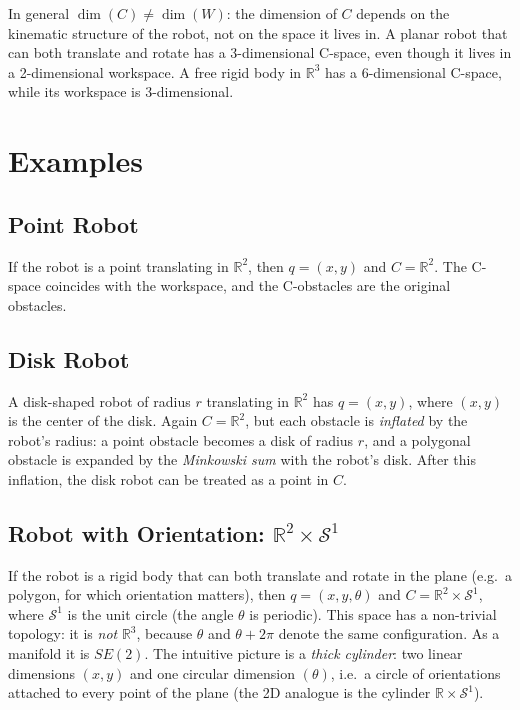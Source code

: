 In general \( \dim(C) \neq \dim(W) \): the dimension of \( C \) depends
on the kinematic structure of the robot, not on the space it lives in.
A planar robot that can both translate and rotate has a 3-dimensional
C-space, even though it lives in a 2-dimensional workspace. A free
rigid body in \( \mathbb{R}^3 \) has a 6-dimensional C-space, while
its workspace is 3-dimensional.

\section{Examples}
\label{sec:cspace-examples}

\subsection{Point Robot}
\label{subsec:point-robot}

If the robot is a point translating in \( \mathbb{R}^2 \), then
\( q = (x, y) \) and \( C = \mathbb{R}^2 \). The C-space coincides
with the workspace, and the C-obstacles are the original obstacles.

\subsection{Disk Robot}
\label{subsec:disk-robot}

A disk-shaped robot of radius \( r \) translating in \( \mathbb{R}^2 \)
has \( q = (x, y) \), where \( (x, y) \) is the center of the disk.
Again \( C = \mathbb{R}^2 \), but each obstacle is \emph{inflated} by
the robot's radius: a point obstacle becomes a disk of radius \( r \),
and a polygonal obstacle is expanded by the \emph{Minkowski sum} with
the robot's disk. After this inflation, the disk robot can be treated
as a point in \( C \).

\subsection{Robot with Orientation: \( \mathbb{R}^2 \times \mathcal{S}^1 \)}
\label{subsec:cspace-orientation}

If the robot is a rigid body that can both translate and rotate in the
plane (e.g.\ a polygon, for which orientation matters), then
\( q = (x, y, \theta) \) and \( C = \mathbb{R}^2 \times \mathcal{S}^1 \),
where \( \mathcal{S}^1 \) is the unit circle (the angle \( \theta \) is
periodic). This space has a non-trivial topology: it is \emph{not}
\( \mathbb{R}^3 \), because \( \theta \) and \( \theta + 2\pi \) denote
the same configuration. As a manifold it is \( SE(2) \). The intuitive
picture is a \emph{thick cylinder}: two linear dimensions \( (x, y) \)
and one circular dimension \( (\theta) \), i.e.\ a circle of
orientations attached to every point of the plane (the 2D analogue is
the cylinder \( \mathbb{R} \times \mathcal{S}^1 \)).

